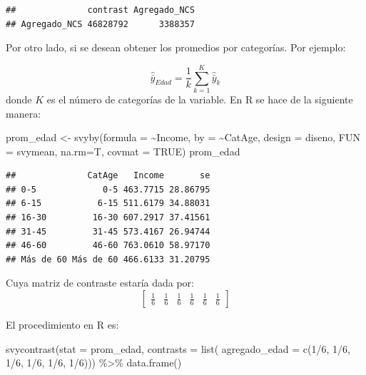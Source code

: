 \documentclass[
  12pt,
]{book}
\newenvironment{Shaded}{\begin{snugshade}}{\end{snugshade}}
\newcommand{\AttributeTok}[1]{\textcolor[rgb]{0.77,0.63,0.00}{#1}}
\newcommand{\ConstantTok}[1]{\textcolor[rgb]{0.00,0.00,0.00}{#1}}
\newcommand{\DecValTok}[1]{\textcolor[rgb]{0.00,0.00,0.81}{#1}}
\newcommand{\FunctionTok}[1]{\textcolor[rgb]{0.00,0.00,0.00}{#1}}
\newcommand{\NormalTok}[1]{#1}
\newcommand{\OtherTok}[1]{\textcolor[rgb]{0.56,0.35,0.01}{#1}}
\newcommand{\SpecialCharTok}[1]{\textcolor[rgb]{0.00,0.00,0.00}{#1}}
\begin{document}
\begin{verbatim}
##              contrast Agregado_NCS
## Agregado_NCS 46828792      3388357
\end{verbatim}

Por otro lado, si se desean obtener los promedios por categorías. Por ejemplo:

\[
\hat{\bar{y}}_{Edad} = \frac{1}{k}\sum_{k=1}^K\hat{\bar{y}}_{k}
\]
donde \(K\) es el número de categorías de la variable. En R se hace de la siguiente manera:

\begin{Shaded}
\begin{Highlighting}[]
\NormalTok{prom\_edad }\OtherTok{\textless{}{-}} \FunctionTok{svyby}\NormalTok{(}\AttributeTok{formula =} \SpecialCharTok{\textasciitilde{}}\NormalTok{Income, }
                   \AttributeTok{by =} \SpecialCharTok{\textasciitilde{}}\NormalTok{CatAge,}
                   \AttributeTok{design =}\NormalTok{  diseno, }
                   \AttributeTok{FUN =}\NormalTok{ svymean, }
                   \AttributeTok{na.rm=}\NormalTok{T,}
                   \AttributeTok{covmat =} \ConstantTok{TRUE}\NormalTok{)}
\NormalTok{prom\_edad}
\end{Highlighting}
\end{Shaded}

\begin{verbatim}
##              CatAge   Income       se
## 0-5             0-5 463.7715 28.86795
## 6-15           6-15 511.6179 34.88031
## 16-30         16-30 607.2917 37.41561
## 31-45         31-45 573.4167 26.94744
## 46-60         46-60 763.0610 58.97170
## Más de 60 Más de 60 466.6133 31.20795
\end{verbatim}

Cuya matriz de contraste estaría dada por:
\[
\left[\begin{array}{cccccc}
\frac{1}{6} & \frac{1}{6} & \frac{1}{6} & \frac{1}{6} & \frac{1}{6} & \frac{1}{6}
\end{array}\right]
\]

El procedimiento en R es:

\begin{Shaded}
\begin{Highlighting}[]
\FunctionTok{svycontrast}\NormalTok{(}\AttributeTok{stat =}\NormalTok{ prom\_edad, }
            \AttributeTok{contrasts =} \FunctionTok{list}\NormalTok{(}
                             \AttributeTok{agregado\_edad =} \FunctionTok{c}\NormalTok{(}\DecValTok{1}\SpecialCharTok{/}\DecValTok{6}\NormalTok{, }\DecValTok{1}\SpecialCharTok{/}\DecValTok{6}\NormalTok{, }\DecValTok{1}\SpecialCharTok{/}\DecValTok{6}\NormalTok{, }\DecValTok{1}\SpecialCharTok{/}\DecValTok{6}\NormalTok{, }\DecValTok{1}\SpecialCharTok{/}\DecValTok{6}\NormalTok{, }\DecValTok{1}\SpecialCharTok{/}\DecValTok{6}\NormalTok{)))             }\SpecialCharTok{\%\textgreater{}\%} \FunctionTok{data.frame}\NormalTok{()}
\end{Highlighting}
\end{Shaded}
\end{document}
